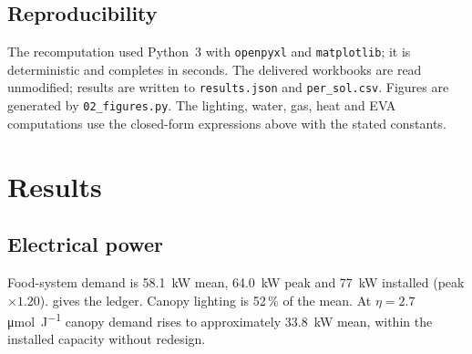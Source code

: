\documentclass[11pt,a4paper,3p,authoryear]{elsarticle}
\begin{document}
\subsection{Reproducibility}

The recomputation used Python~3 with \texttt{openpyxl} and \texttt{matplotlib}; it is deterministic and completes in seconds. The delivered workbooks are read unmodified; results are written to \texttt{results.json} and \texttt{per\_sol.csv}. Figures are generated by \texttt{02\_figures.py}. The lighting, water, gas, heat and EVA computations use the closed-form expressions above with the stated constants.

\section{Results}\label{sec:results}

\subsection{Electrical power}

Food-system demand is \SI{58.1}{\kilo\watt} mean, \SI{64.0}{\kilo\watt} peak and \SI{77}{\kilo\watt} installed (peak $\times 1.20$).  gives the ledger. Canopy lighting is 52\,\% of the mean. At $\eta = 2.7$ \si{\micro\mole\per\joule} canopy demand rises to approximately \SI{33.8}{\kilo\watt} mean, within the installed capacity without redesign.
\end{document}
